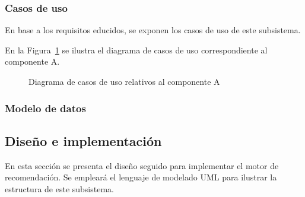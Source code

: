 \subsubsection{Casos de uso}
En base a los requisitos educidos, se exponen los casos de uso de este subsistema.

En la Figura~\ref{f:dev:use-cases-recsys} se ilustra el diagrama de casos de uso correspondiente al componente A.

\begin{figure}[h!]
\centering
\caption{Diagrama de casos de uso relativos al componente A}
\label{f:dev:use-cases-recsys}
\end{figure}

\subsubsection{Modelo de datos}


\subsection{Diseño e implementación}
En esta sección se presenta el diseño seguido para implementar el motor de recomendación. Se empleará el lenguaje de modelado UML para ilustrar la estructura de este subsistema.
